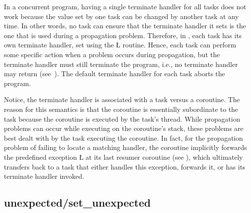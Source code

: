 \documentclass[openright,twoside]{report}
\begin{document}
In a concurrent program, having a single terminate handler for all tasks does not work because the value set by one task can be changed by another task at any time.
In other words, no task can ensure that the terminate handler it sets is the one that is used during a propagation problem.
Therefore, in \uC, each task has its own terminate handler, set using the \LGinlinetrue\LGbegin\lgrinde\L{}\endlgrinde\LGend{} routine.
Hence, each task can perform some specific action when a problem occurs during propagation, but the terminate handler must still terminate the program, i.e., no terminate handler may return (see~).
The default terminate handler for each task aborts the program.

Notice, the terminate handler is associated with a task versus a coroutine.
The reason for this semantics is that the coroutine is essentially subordinate to the task because the coroutine is executed by the task's thread.
While propagation problems can occur while executing on the coroutine's stack, these problems are best dealt with by the task executing the coroutine.
In fact, for the propagation problem of failing to locate a matching handler, the coroutine implicitly forwards the predefined exception \LGinlinetrue\LGbegin\lgrinde\L{}\endlgrinde\LGend{} at its last resumer coroutine (see ), which ultimately transfers back to a task that either handles this exception, forwards it, or has its terminate handler invoked.


\subsection{{\texorpdfstring{{\BGfont unexpected}/{\BGfont set\_unexpected}}{unexpected/set\_unexpected}}}
\end{document}
